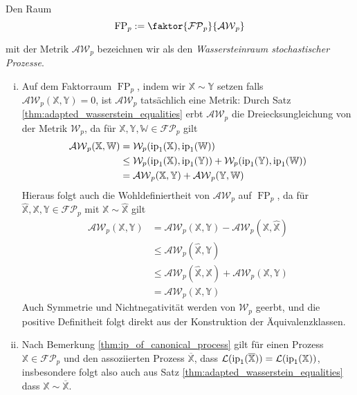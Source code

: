 \begin{definition}
    Den Raum
    $$\operatorname{FP}_p := \faktor{\mathcal{FP}_p}{\mathcal{AW}_p}$$

    mit der Metrik $\mathcal{AW}_p$ bezeichnen wir als den \emph{Wassersteinraum stochastischer Prozesse}.
\end{definition}
\begin{remark}
    \begin{enumerate}[(i)]
    \item Auf dem Faktorraum $\operatorname{FP}_p$, indem wir $\mathbb{X} \sim \mathbb{Y}$ setzen falls \\
     $\mathcal{AW}_p(\mathbb{X}, \mathbb{Y})=0$, ist $\mathcal{AW}_p$ tatsächlich eine Metrik: Durch Satz \ref{thm:adapted_wasserstein_equalities} erbt $\mathcal{AW}_p$ die Dreiecksungleichung von der Metrik $\mathcal{W}_p$, da für $\mathbb{X,Y,W} \in \mathcal{FP}_p$ gilt 
    \begin{align*}
        \mathcal{AW}_p(\mathbb{X,W}) &= \mathcal{W}_p(\operatorname{ip}_1(\mathbb{X}), \operatorname{ip}_1(\mathbb{W})) \\
        &\leq \mathcal{W}_p(\operatorname{ip}_1(\mathbb{X}), \operatorname{ip}_1(\mathbb{Y})) + \mathcal{W}_p(\operatorname{ip}_1(\mathbb{Y}), \operatorname{ip}_1(\mathbb{W})) \\
        &= \mathcal{AW}_p(\mathbb{X,Y}) + \mathcal{AW}_p(\mathbb{Y, W})
    \end{align*}
    Hieraus folgt auch die Wohldefiniertheit von $\mathcal{AW}_p$ auf $\operatorname{FP}_p$, da für $\hat{\mathbb{X}}, \mathbb{X,Y} \in \mathcal{FP}_p$ mit $\mathbb{X}\sim\hat{\mathbb{X}}$ gilt
    \begin{align*}
        \mathcal{AW}_p(\mathbb{X,Y}) &= \mathcal{AW}_p(\mathbb{X}, \mathbb{Y}) - \mathcal{AW}_p(\mathbb{X}, \hat{\mathbb{X}}) \\
        &\leq \mathcal{AW}_p(\hat{\mathbb{X}}, \mathbb{Y}) \\
        &\leq \mathcal{AW}_p(\hat{\mathbb{X}}, \mathbb{X}) + \mathcal{AW}_p(\mathbb{X,Y}) \\
        &= \mathcal{AW}_p(\mathbb{X,Y})
    \end{align*}
    Auch Symmetrie und Nichtnegativität werden von $\mathcal{W}_p$ geerbt, und die positive Definitheit folgt direkt aus der Konstruktion der Äquivalenzklassen.

    \item Nach Bemerkung \ref{thm:ip_of_canonical_process} gilt für einen Prozess $\mathbb{X} \in \mathcal{FP}_p$ und den assoziierten Prozess $\overline{\mathbb{X}}$, dass $\mathcal{L}(\operatorname{ip}_1(\overline{\mathbb{X}})) = \mathcal{L}(\operatorname{ip}_1(\mathbb{X}))$, insbesondere folgt also auch aus Satz \ref{thm:adapted_wasserstein_equalities} dass $\mathbb{X} \sim \overline{\mathbb{X}}$.


\end{enumerate}
\end{remark}
